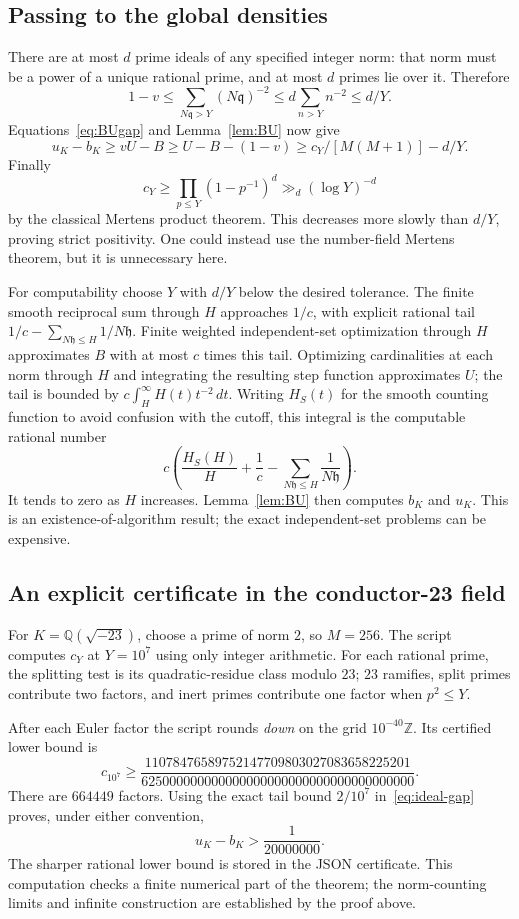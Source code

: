 \subsection{Passing to the global densities}

There are at most $d$ prime ideals of any specified integer norm:
that norm must be a power of a unique rational prime, and at most $d$
primes lie over it.  Therefore
\[
 1-v\le\sum_{N\mathfrak q>Y}(N\mathfrak q)^{-2}
       \le d\sum_{n>Y}n^{-2}\le d/Y.
\]
Equations~\eqref{eq:BUgap} and Lemma~\ref{lem:BU} now give
\[
 u_K-b_K\ge vU-B\ge U-B-(1-v)
                     \ge c_Y/[M(M+1)]-d/Y.
\]
Finally
\[
 c_Y\ge\prod_{p\le Y}(1-p^{-1})^d\gg_d(\log Y)^{-d}
\]
by the classical Mertens product theorem.  This decreases more slowly
than $d/Y$, proving strict positivity.  One could instead use the
number-field Mertens theorem, but it is unnecessary here.

For computability choose $Y$ with $d/Y$ below the desired tolerance.
The finite smooth reciprocal sum through $H$ approaches $1/c$, with
explicit rational tail
$1/c-\sum_{N\mathfrak h\le H}1/N\mathfrak h$.
Finite weighted independent-set optimization through $H$ approximates
$B$ with at most $c$ times this tail.  Optimizing cardinalities at
each norm through $H$ and integrating the resulting step function
approximates $U$; the tail is bounded by
$c\int_H^\infty H(t)t^{-2}\,dt$.  Writing $H_S(t)$ for the smooth
counting function to avoid confusion with the cutoff, this integral is
the computable rational number
\[
 c\left(\frac{H_S(H)}{H}+\frac1c
             -\sum_{N\mathfrak h\le H}\frac1{N\mathfrak h}\right).
\]
It tends to zero as $H$ increases. Lemma~\ref{lem:BU} then
computes $b_K$ and $u_K$.  This is an existence-of-algorithm result;
the exact independent-set problems can be expensive.

\subsection{An explicit certificate in the conductor-23 field}

For $K=\mathbb Q(\sqrt{-23})$, choose a prime of norm $2$, so $M=256$.
The script  computes $c_Y$ at
$Y=10^7$ using only integer arithmetic.  For each rational prime,
the splitting test is its quadratic-residue class modulo $23$;
$23$ ramifies, split primes contribute two factors, and inert primes
contribute one factor when $p^2\le Y$.

After each Euler factor the script rounds \emph{down} on the grid
$10^{-40}\mathbb Z$.  Its certified lower bound is
\[
 c_{10^7}\ge
 \frac{11078476589752147709803027083658225201}
      {625000000000000000000000000000000000000}.
\]
There are $664449$ factors.  Using the exact tail bound $2/10^7$
in~\eqref{eq:ideal-gap} proves, under either convention,
\begin{equation}\label{eq:ideal-explicit-gap}
                         u_K-b_K>\frac1{20000000}.
\end{equation}
The sharper rational lower bound is stored in the JSON certificate.
This computation checks a finite numerical part of the theorem; the
norm-counting limits and infinite construction are established by the
proof above.


